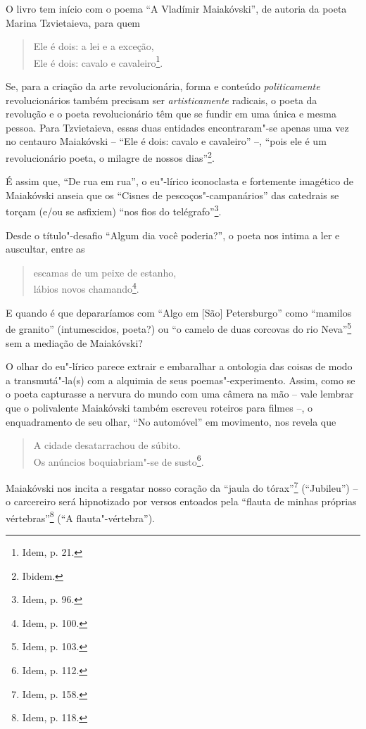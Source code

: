 O livro tem início com o poema ``A Vladímir Maiakóvski'', de autoria da
poeta Marina Tzvietaieva, para quem

\begin{verse}
Ele é dois: a lei e a exceção,\\
Ele é dois: cavalo e cavaleiro\footnote{Idem, p. 21.}.
\end{verse}

Se, para a criação da arte revolucionária, forma e conteúdo
\emph{politicamente} revolucionários também precisam ser
\emph{artisticamente} radicais, o poeta da revolução e o poeta
revolucionário têm que se fundir em uma única e mesma pessoa. Para
Tzvietaieva, essas duas entidades encontraram"-se apenas uma vez no
centauro Maiakóvski -- ``Ele é dois: cavalo e cavaleiro'' --, ``pois ele
é um revolucionário poeta, o milagre de nossos dias''\footnote{Ibidem.}.

É assim que, ``De rua em rua'', o eu"-lírico iconoclasta e fortemente
imagético de Maiakóvski anseia que os ``Cisnes de pescoços"-campanários''
das catedrais se torçam (e/ou se asfixiem) ``nos fios do
telégrafo''\footnote{Idem, p. 96.}.

Desde o título"-desafio ``Algum dia você poderia?'', o poeta nos intima a
ler e auscultar, entre as

\begin{verse}
escamas de um peixe de estanho,\\
lábios novos chamando\footnote{Idem, p. 100.}.
\end{verse}

E quando é que depararíamos com ``Algo em {[}São{]} Petersburgo'' como
``mamilos de granito'' (intumescidos, poeta?) ou ``o camelo de duas
corcovas do rio Neva''\footnote{Idem, p. 103.} sem a mediação de
Maiakóvski?

O olhar do eu"-lírico parece extrair e embaralhar a ontologia das coisas
de modo a transmutá"-la(s) com a alquimia de seus poemas"-experimento.
Assim, como se o poeta capturasse a nervura do mundo com uma câmera na
mão -- vale lembrar que o polivalente Maiakóvski também escreveu
roteiros para filmes --, o enquadramento de seu olhar, ``No automóvel''
em movimento, nos revela que

\begin{verse}
A cidade desatarrachou de súbito.\\
Os anúncios boquiabriam"-se de susto\footnote{Idem, p. 112.}.
\end{verse}

Maiakóvski nos incita a resgatar nosso coração da ``jaula do
tórax''\footnote{Idem, p. 158.} (``Jubileu'') -- o carcereiro será
hipnotizado por versos entoados pela ``flauta de minhas próprias
vértebras''\footnote{Idem, p. 118.} (``A flauta"-vértebra'').

